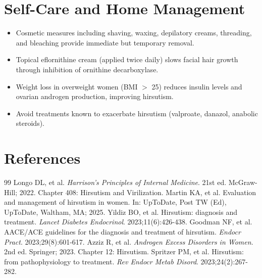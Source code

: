 \section*{Self-Care and Home Management}
\begin{itemize}
  \item Cosmetic measures including shaving, waxing, depilatory creams, threading, and bleaching provide immediate but temporary removal.
  \item Topical eflornithine cream (applied twice daily) slows facial hair growth through inhibition of ornithine decarboxylase.
  \item Weight loss in overweight women (BMI $>$ 25) reduces insulin levels and ovarian androgen production, improving hirsutism.
  \item Avoid treatments known to exacerbate hirsutism (valproate, danazol, anabolic steroids).
\end{itemize}

\section*{References}

\begin{thebibliography}{99}
 Longo DL, et al. \emph{Harrison's Principles of Internal Medicine}. 21st ed. McGraw-Hill; 2022. Chapter 408: Hirsutism and Virilization.
 Martin KA, et al. Evaluation and management of hirsutism in women. In: UpToDate, Post TW (Ed), UpToDate, Waltham, MA; 2025.
 Yildiz BO, et al. Hirsutism: diagnosis and treatment. \emph{Lancet Diabetes Endocrinol}. 2023;11(6):426-438.
 Goodman NF, et al. AACE/ACE guidelines for the diagnosis and treatment of hirsutism. \emph{Endocr Pract}. 2023;29(8):601-617.
 Azziz R, et al. \emph{Androgen Excess Disorders in Women}. 2nd ed. Springer; 2023. Chapter 12: Hirsutism.
 Spritzer PM, et al. Hirsutism: from pathophysiology to treatment. \emph{Rev Endocr Metab Disord}. 2023;24(2):267-282.
\end{thebibliography}

